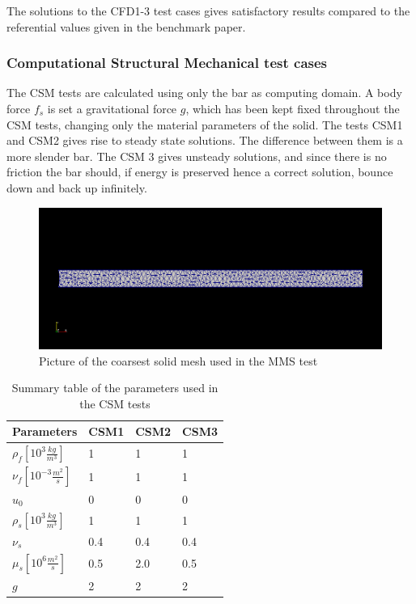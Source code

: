 The solutions to the CFD1-3 test cases gives satisfactory results compared to the referential values given in the benchmark paper.

\subsubsection{Computational Structural Mechanical test cases}
The CSM tests are calculated using only the bar as computing domain. A body force $f_s$ is set a gravitational force $g$, which has been kept fixed throughout the CSM tests, changing only the material parameters of the solid. The tests CSM1 and CSM2 gives rise to steady state solutions. The difference between them is a more slender bar. 
The CSM 3 gives unsteady solutions, and since there is no friction the bar should, if energy is preserved hence a correct solution, bounce down and back up infinitely. 

\begin{center}
\begin{figure}[H]
\caption{Picture of the coarsest solid mesh used in the MMS test}
\includegraphics[scale=0.50,trim={18mm 55mm 18mm 55mm},clip]{./Verification_Validation/Hron_Turek/structure.png}
\end{figure}
\end{center}

\vspace{0cm}

\begin{table}[H]
\centering
\caption{Summary table of the parameters used in the CSM tests}
\label{my-label}
\begin{tabular}{|l|l|l|l|}
\hline
Parameters & CSM1 & CSM2 & CSM3 \\ \hline
$\rho_f[10^3 \frac{kg}{m^3}]$ & 1 & 1 & 1 \\ \hline
$\nu_f [10^{-3} \frac{m^2}{s}]$ & 1 & 1 & 1 \\ \hline
$u_0$ & 0 & 0 & 0 \\ \hline
$\rho_s[10^3 \frac{kg}{m^3}]$ & 1 & 1 & 1 \\ \hline
$\nu_s$ & 0.4 & 0.4 & 0.4 \\ \hline
$\mu_s[10^6 \frac{m^2}{s}]$ & 0.5 & 2.0 & 0.5 \\ \hline
$g $ & 2 & 2 & 2 \\ \hline
\end{tabular}
\end{table}


